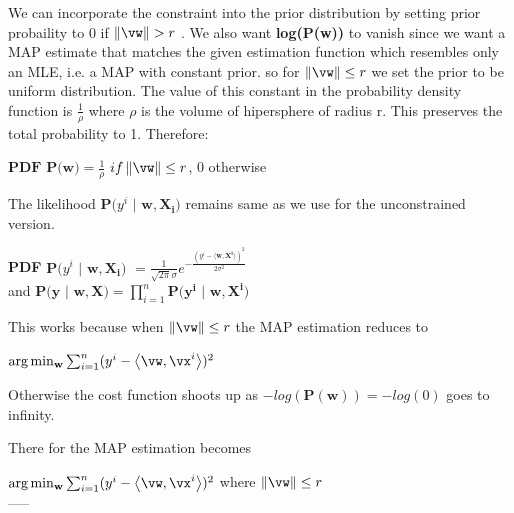 \documentclass[a4paper,11pt]{article}
\begin{document}
\begin{mlsolution}

We can incorporate the constraint into the prior distribution by setting prior probaility to 0 if $\norm{\vw} > r$ . We also want \textbf{log(P(w))} to vanish since  we want a MAP estimate that matches the given estimation function which resembles only an MLE, i.e. a MAP with constant prior. so for  $\norm{\vw} \leq r$ we set the prior to be uniform distribution. The value of this constant in the probability density function is $\frac{1}{\rho}$ where $\rho$ is the volume of hipersphere of radius r. This preserves the total probability to 1. Therefore:

\begin{center}
$\textbf{PDF P(w)} = \frac{1}{\rho}$ $if \norm{\vw} \leq r$, 0 otherwise
\end{center}

The likelihood $\mathbf{P(}y^i$ $|$ $\mathbf{w,X_i)}$ remains same as we use for the unconstrained version.
\begin{center}
\textbf{PDF} $\mathbf{P(}y^i$ $|$ $\mathbf{w,X_i)}$ $= \frac{1}{\sqrt{2\pi}\sigma}e^{-\frac{(y^i - \langle\mathbf{w,X^i\rangle})^2}{2\sigma^2}}$\\[1 em]

and $\mathbf{P( y}$ $|$ $\mathbf{w,X)} = \prod_{i=1}^{n} \mathbf{P( y^i}$ $|$ $\mathbf{w,X^i)}$ \\[1 em]
\end{center}

This works because when  $\norm{\vw} \leq r$ the MAP estimation reduces to 
\begin{center}
$\arg\min_{\mathbf{w}} \sum_{i=1}^n(y^i - \ip{\vw}{\vx^i})^2$
\end{center}

Otherwise the cost function shoots up as $-log(\mathbf{P(w)}) = - log(0)$ goes to infinity.

There for the MAP estimation becomes
\begin{center}
$\arg\min_{\mathbf{w}} \sum_{i=1}^n(y^i - \ip{\vw}{\vx^i})^2$ where $\norm{\vw} \leq r$\\[1em]

-----
\end{center}
%

\end{mlsolution}
\end{document}
